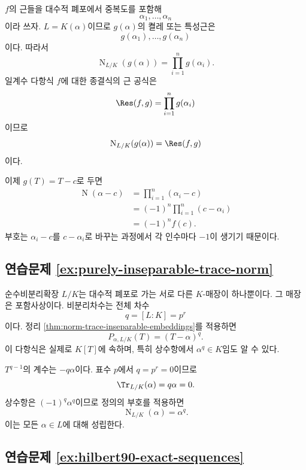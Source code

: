 \begin{solution}
$f$의 근들을 대수적 폐포에서 중복도를 포함해
\[
  \alpha_1,\dots,\alpha_n
\]
이라 쓰자. $L=K(\alpha)$이므로 $g(\alpha)$의 켤레 또는 특성근은
\[
  g(\alpha_1),\dots,g(\alpha_n)
\]
이다. 따라서
\[
  \operatorname N_{L/K}(g(\alpha))
  =\prod_{i=1}^n g(\alpha_i).
\]
일계수 다항식 $f$에 대한 종결식의 근 공식은
\[
  \Res(f,g)=\prod_{i=1}^n g(\alpha_i)
\]
이므로
\[
  \operatorname N_{L/K}(g(\alpha))=\Res(f,g)
\]
이다.

이제 $g(T)=T-c$로 두면
\[
\begin{aligned}
  \operatorname N(\alpha-c)
  &=\prod_{i=1}^n(\alpha_i-c)\\
  &=(-1)^n\prod_{i=1}^n(c-\alpha_i)\\
  &=(-1)^n f(c).
\end{aligned}
\]
부호는 $\alpha_i-c$를 $c-\alpha_i$로 바꾸는 과정에서 각 인수마다 $-1$이 생기기 때문이다.
\end{solution}

\subsection*{연습문제 \ref{ex:purely-inseparable-trace-norm}}

\begin{solution}
순수비분리확장 $L/K$는 대수적 폐포로 가는 서로 다른 $K$-매장이 하나뿐이다. 그 매장은 포함사상이다. 비분리차수는 전체 차수
\[
  q=[L:K]=p^r
\]
이다. 정리 \ref{thm:norm-trace-inseparable-embeddings}를 적용하면
\[
  P_{\alpha,L/K}(T)=(T-\alpha)^q.
\]
이 다항식은 실제로 $K[T]$에 속하며, 특히 상수항에서 $\alpha^q\in K$임도 알 수 있다.

$T^{q-1}$의 계수는 $-q\alpha$이다. 표수 $p$에서 $q=p^r=0$이므로
\[
  \Tr_{L/K}(\alpha)=q\alpha=0.
\]
상수항은 $(-1)^q\alpha^q$이므로 정의의 부호를 적용하면
\[
  \operatorname N_{L/K}(\alpha)=\alpha^q.
\]
이는 모든 $\alpha\in L$에 대해 성립한다.
\end{solution}

\subsection*{연습문제 \ref{ex:hilbert90-exact-sequences}}


